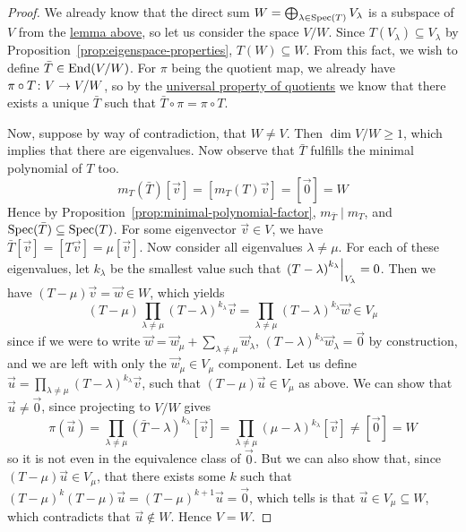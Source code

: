\begin{proof}
    We already know that the direct sum \(W = \bigoplus_{\lambda\in\operatorname{Spec}(T)} V_{\lambda}\)
    is a subspace of \(V\) from the \hyperref[lem:eigenspace-direct-sum]{lemma above},
    so let us consider the space \(V/W\).
    Since \(T(V_\lambda) \subseteq V_\lambda\) by Proposition~\ref{prop:eigenspace-properties},
    \(T(W) \subseteq W\).
    From this fact, we wish to define \(\bar{T} \in \operatorname{End}(V/W)\).
    For \(\pi\) being the quotient map,
    we already have \(\pi \circ T\colon V\to V/W\),
    so by the \hyperref[prop:univ-prop-quotient-vsp]{universal property of quotients}
    we know that there exists a unique \(\bar{T}\) such that \(\bar{T}\circ\pi = \pi \circ T\).

    Now, suppose by way of contradiction, that \(W \neq V\).
    Then \(\dim V/W \geq 1\), which implies that there are eigenvalues.
    Now observe that \(\bar{T}\) fulfills the minimal polynomial of \(T\) too.
    \begin{equation*}
        m_T(\bar{T})[\vec{v}] = [m_T(T)\vec{v}] = [\vec{0}] = W
    \end{equation*}
    Hence by Proposition~\ref{prop:minimal-polynomial-factor},
    \(m_{\bar{T}} \mid m_T\), and \(\operatorname{Spec}(\bar{T}) \subseteq \operatorname{Spec}(T)\).
    For some eigenvector \(\vec{v} \in V\),
    we have \(\bar{T}[\vec{v}] = [T\vec{v}] = \mu[\vec{v}]\).
    Now consider all eigenvalues \(\lambda \neq \mu\).
    For each of these eigenvalues, let \(k_\lambda\) be the smallest value
    such that \(\eval{{(T-\lambda)}^{k_\lambda}}_{V_\lambda} = 0\).
    Then we have \((T-\mu)\vec{v} = \vec{w} \in W\), which yields
    \begin{equation*}
        (T-\mu) \prod_{\lambda\neq\mu} {(T-\lambda)}^{k_\lambda} \vec{v}
        = \prod_{\lambda\neq\mu} {(T-\lambda)}^{k_\lambda} \vec{w} \in V_\mu
    \end{equation*}
    since if we were to write \(\vec{w} = \vec{w}_\mu + \sum_{\lambda\neq\mu} \vec{w}_\lambda\),
    \({(T-\lambda)}^{k_\lambda} \vec{w}_\lambda = \vec{0}\) by construction,
    and we are left with only the \(\vec{w}_\mu \in V_\mu\) component.
    Let us define \(\vec{u} = \prod_{\lambda\neq\mu} {(T-\lambda)}^{k_\lambda} \vec{v}\),
    such that \((T-\mu)\vec{u} \in V_\mu\) as above.
    We can show that \(\vec{u} \neq \vec{0}\), since projecting to \(V/W\) gives
    \begin{equation*}
        \pi(\vec{u}) = \prod_{\lambda\neq\mu} {(\bar{T}-\lambda)}^{k_\lambda} [\vec{v}]
        = \prod_{\lambda\neq\mu} {(\mu-\lambda)}^{k_\lambda} [\vec{v}]
        \neq [\vec{0}] = W
    \end{equation*}
    so it is not even in the equivalence class of \(\vec{0}\).
    But we can also show that, since \((T-\mu)\vec{u} \in V_\mu\),
    that there exists some \(k\) such that
    \({(T-\mu)}^k(T-\mu)\vec{u} = {(T-\mu)}^{k+1}\vec{u} = \vec{0}\),
    which tells is that \(\vec{u} \in V_\mu \subseteq W\),
    which contradicts that \(\vec{u} \notin W\).
    Hence \(V = W\).
\end{proof}

